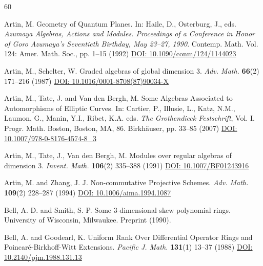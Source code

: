 \documentclass[reqno]{amsart}
\theoremstyle{definition}
\theoremstyle{remark}
\numberwithin{equation}{section}
\begin{document}
\begin{thebibliography}{60}

 Artin, M. Geometry of Quantum Planes. In: Haile, D., Osterburg, J., eds. {\em Azumaya Algebras, Actions and Modules. Proceedings of a Conference in Honor of Goro Azumaya's Seventieth Birthday, May 23--27, 1990}. Contemp. Math. Vol. 124: Amer. Math. Soc., pp. 1--15 (1992) \href{https://doi.org/10.1090/conm/124/1144023}{DOI: 10.1090/conm/124/1144023}

 Artin, M., Schelter, W. Graded algebras of global dimension 3. {\em Adv. Math.} {\bf 66}(2) 171--216 (1987) \href{https://doi.org/10.1016/0001-8708(87)90034-X}{DOI: 10.1016/0001-8708(87)90034-X}

 Artin, M., Tate, J. and Van den Bergh, M. Some Algebras Associated to Automorphisms of Elliptic Curves. In: Cartier, P., Illusie, L., Katz, N.M., Laumon, G., Manin, Y.I., Ribet, K.A. eds. {\em The Grothendieck Festschrift}, Vol. I. Progr. Math. Boston, Boston, MA, 86. Birkh\"auser, pp. 33--85 (2007) \href{https://doi.org/10.1007/978-0-8176-4574-8_3}{DOI: 10.1007/978-0-8176-4574-8\_3}

 Artin, M., Tate, J., Van den Bergh, M. Modules over regular algebras of dimension 3. {\em Invent. Math.} {\bf 106}(2) 335--388 (1991) \href{https://doi.org/10.1007/BF01243916}{DOI: 10.1007/BF01243916}

 Artin, M. and Zhang, J. J. Non-commutative Projective Schemes. {\em Adv. Math.} {\bf 109}(2) 228--287 (1994) \href{https://doi.org/10.1006/aima.1994.1087}{DOI:  10.1006/aima.1994.1087}


 Bell, A. D. and Smith, S. P. Some 3-dimensional skew polynomial rings. University of Wisconsin, Milwaukee. Preprint (1990).

 Bell, A. and Goodearl, K. Uniform Rank Over Differential Operator Rings and Poincar{\'e}-Birkhoff-Witt Extensions. {\em Pacific J. Math.} {\bf 131}(1) 13--37 (1988) \linebreak \href{https://doi.org/10.2140/pjm.1988.131.13}{DOI: 10.2140/pjm.1988.131.13}


\end{thebibliography}
\end{document}
